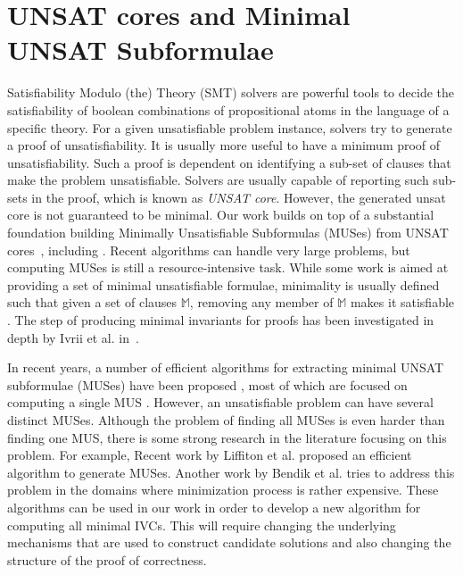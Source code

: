 \section{UNSAT cores and Minimal UNSAT Subformulae}
Satisfiability Modulo (the) Theory (SMT) solvers are powerful tools to decide the
satisfiability of boolean combinations
of propositional atoms in the language of a specific theory. For a given unsatisfiable problem instance, solvers try to generate a proof of unsatisfiability. It is usually more useful to have a minimum proof of unsatisfiability. Such a proof is dependent on identifying a sub-set of clauses that make the problem unsatisfiable. Solvers are usually capable of reporting such sub-sets in the proof, which is known as \emph{UNSAT core}. However, the generated unsat core is not guaranteed to be minimal.
Our work builds on top of a substantial foundation building Minimally Unsatisfiable Subformulas
(MUSes) from UNSAT cores~\cite{Cimatti2007:UNSAT}, including \cite{marques2010minimal, belov2012towards, ryvchin2011faster, belov2012computing, nadel2010boosting}.  Recent algorithms can handle very large problems, but computing MUSes is still a resource-intensive task.  While some work is aimed at providing a set of minimal unsatisfiable formulae, minimality is usually defined such that given a set of clauses $\mathbb{M}$, removing any member of $\mathbb{M}$ makes it satisfiable \cite{belov2012computing}.  The step of producing minimal invariants for proofs has been investigated in depth by Ivrii et al. in~\cite{Ivrii14:invariants}.

In  recent  years,  a  number  of  efficient algorithms  for  extracting minimal UNSAT subformulae (MUSes)  have  been proposed \cite{liffiton2005max},
most of which are focused on computing a single MUS  \cite{bacchus2015using, belov2012muser2, belov2013core, belov2012towards, nadel2014accelerated}.
However, an unsatisfiable problem can have several distinct MUSes. Although the problem of finding all MUSes is even harder than finding one MUS, there is some strong research in the literature focusing on this problem. For example, Recent work by Liffiton et al. \cite{marco2016fast} proposed an efficient algorithm to generate MUSes.
Another work by Bendik et al. \cite{bendk16} tries to address this problem in the domains where minimization process is rather expensive.
These algorithms can be used in our work in order to develop a new algorithm for computing all minimal IVCs. This will require changing the underlying mechanisms that are used to construct candidate solutions and also changing the structure of the proof of correctness.

